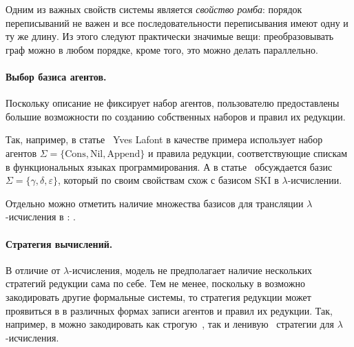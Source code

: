 Одним из важных свойств системы является \textit{свойство ромба}: порядок переписываний не важен и все последовательности переписывания имеют одну и ту же длину.
Из этого следуют практически значимые вещи: преобразовывать граф можно в любом порядке, кроме того, это можно делать параллельно.

\paragraph{Выбор базиса агентов.}

Поскольку описание \INs{} не фиксирует набор агентов, пользователю предоставлены большие возможности по созданию собственных наборов и правил их редукции.

Так, например, в статье~\cite{lafontInteractionNets1989} Yves Lafont в качестве примера использует набор агентов $\Sigma = \{\text{Cons}, \text{Nil}, \text{Append}\}$ и правила редукции, соответствующие спискам в функциональных языках программирования.
А в статье~\cite{lafontInteractionCombinators1997a} обсуждается базис $\Sigma = \{\gamma, \delta, \varepsilon\}$, который по своим свойствам схож с базисом SKI в $\lambda$-исчислении.

Отдельно можно отметить наличие множества базисов для трансляции $\lambda$-исчисления в \INs{}: \cite{lampingAlgorithmOptimalLambda1990,aspertiBolognaOptimalHigherorder1996,gonthierGeometryOptimalLambda1992,mackieInteractionNetImplementation2011,vincentvanoostromLambdascopeAnotherOptimal2004,sinotCallbyNameCallbyValueTokenPassing2005}.

\paragraph{Стратегия вычислений.}

В отличие от $\lambda$-исчисления, модель \INs{} не предполагает наличие нескольких стратегий редукции сама по себе.
Тем не менее, поскольку в \INs{} возможно закодировать другие формальные системы, то стратегия редукции может проявиться в \INs{} в различных формах записи агентов и правил их редукции.
Так, например, в \INs{} можно закодировать как строгую~\cite{sinotCallbyNameCallbyValueTokenPassing2005}, так и ленивую~\cite{sinotTokenPassingNetsCallbyNeed2006} стратегии для $\lambda$-исчисления.
